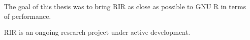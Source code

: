 The goal of this thesis was to bring RIR as close as possible to GNU R in terms of performance.

RIR is an ongoing research project under active development.

